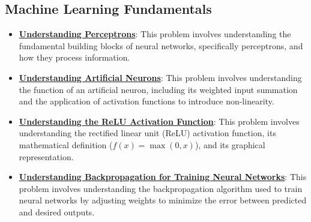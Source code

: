 \documentclass{article}%
\begin{document}
\subsection{Machine Learning Fundamentals}%
\label{subsec:MachineLearningFundamentals}%
\begin{itemize}[leftmargin=*]%
\item \href{https://purdue.brightspace.com/d2l/common/assets/pdfjs-d2l-dist/1.0.14-legacy/web/viewer.html?file=\%2Fcontent\%2Fenforced\%2F1095467-wl.202510.CS.24300.001\%2F02L2-Intro.pdf\%3Fou\%3D1095467\&lang=en-us\&container=d2l-fileviewer-rendered-pdf\&fullscreen=d2l-fileviewer-rendered-pdf-dialog\&height=667#page=45}{\textbf{Understanding Perceptrons}}: This problem involves understanding the fundamental building blocks of neural networks, specifically perceptrons, and how they process information.%
\item \href{https://purdue.brightspace.com/d2l/common/assets/pdfjs-d2l-dist/1.0.14-legacy/web/viewer.html?file=\%2Fcontent\%2Fenforced\%2F1095467-wl.202510.CS.24300.001\%2F09L1-cnn.pdf\%3Fou\%3D1095467\&lang=en-us\&container=d2l-fileviewer-rendered-pdf\&fullscreen=d2l-fileviewer-rendered-pdf-dialog\&height=667#page=5}{\textbf{Understanding Artificial Neurons}}: This problem involves understanding the function of an artificial neuron, including its weighted input summation and the application of activation functions to introduce non-linearity.%
\item \href{https://purdue.brightspace.com/d2l/common/assets/pdfjs-d2l-dist/1.0.14-legacy/web/viewer.html?file=\%2Fcontent\%2Fenforced\%2F1095467-wl.202510.CS.24300.001\%2F09L1-cnn.pdf\%3Fou\%3D1095467\&lang=en-us\&container=d2l-fileviewer-rendered-pdf\&fullscreen=d2l-fileviewer-rendered-pdf-dialog\&height=667#page=13}{\textbf{Understanding the ReLU Activation Function}}: This problem involves understanding the rectified linear unit (ReLU) activation function, its mathematical definition ($f(x) = \max(0, x)$), and its graphical representation.%
\item \href{https://purdue.brightspace.com/d2l/common/assets/pdfjs-d2l-dist/1.0.14-legacy/web/viewer.html?file=\%2Fcontent\%2Fenforced\%2F1095467-wl.202510.CS.24300.001\%2F09L1-cnn.pdf\%3Fou\%3D1095467\&lang=en-us\&container=d2l-fileviewer-rendered-pdf\&fullscreen=d2l-fileviewer-rendered-pdf-dialog\&height=667#page=16}{\textbf{Understanding Backpropagation for Training Neural Networks}}: This problem involves understanding the backpropagation algorithm used to train neural networks by adjusting weights to minimize the error between predicted and desired outputs.%

\end{itemize}
\end{document}
